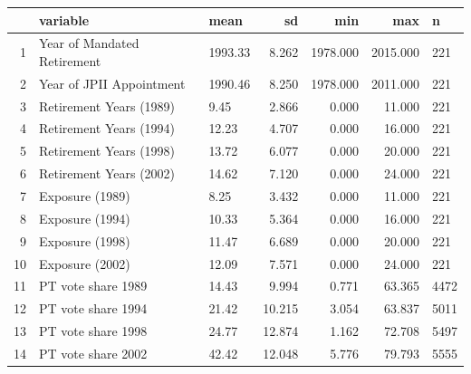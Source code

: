 \begin{table}[ht]
\centering
\begin{tabular}{rllrrrl}
  \hline
 & variable & mean & sd & min & max & n \\ 
  \hline
1 & Year of Mandated Retirement & 1993.33 & 8.262 & 1978.000 & 2015.000 & 221 \\ 
  2 & Year of JPII Appointment & 1990.46 & 8.250 & 1978.000 & 2011.000 & 221 \\ 
  3 & Retirement Years (1989) & 9.45 & 2.866 & 0.000 & 11.000 & 221 \\ 
  4 & Retirement Years (1994) & 12.23 & 4.707 & 0.000 & 16.000 & 221 \\ 
  5 & Retirement Years (1998) & 13.72 & 6.077 & 0.000 & 20.000 & 221 \\ 
  6 & Retirement Years (2002) & 14.62 & 7.120 & 0.000 & 24.000 & 221 \\ 
  7 & Exposure (1989) & 8.25 & 3.432 & 0.000 & 11.000 & 221 \\ 
  8 & Exposure (1994) & 10.33 & 5.364 & 0.000 & 16.000 & 221 \\ 
  9 & Exposure (1998) & 11.47 & 6.689 & 0.000 & 20.000 & 221 \\ 
  10 & Exposure (2002) & 12.09 & 7.571 & 0.000 & 24.000 & 221 \\ 
  11 & PT vote share 1989 & 14.43 & 9.994 & 0.771 & 63.365 & 4472 \\ 
  12 & PT vote share 1994 & 21.42 & 10.215 & 3.054 & 63.837 & 5011 \\ 
  13 & PT vote share 1998 & 24.77 & 12.874 & 1.162 & 72.708 & 5497 \\ 
  14 & PT vote share 2002 & 42.42 & 12.048 & 5.776 & 79.793 & 5555 \\ 
   \hline
\end{tabular}
\end{table}
